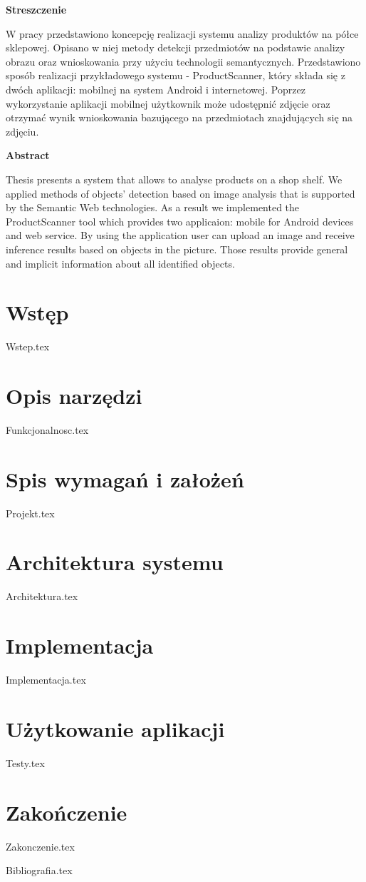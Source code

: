 \documentclass[12pt,a4paper,leqno,oneside,titlepage]{mwrep}
\begin{document}
\thispagestyle{empty}
\newpage

\shipout\null
\begin{center}
{\large\textbf{Streszczenie}}
\end{center}
W pracy przedstawiono koncepcję realizacji systemu analizy produktów na półce sklepowej. Opisano w niej metody detekcji przedmiotów na podstawie analizy obrazu oraz wnioskowania przy użyciu technologii semantycznych. Przedstawiono sposób realizacji przykładowego systemu - ProductScanner, który składa się z dwóch aplikacji: mobilnej na system Android i internetowej. Poprzez wykorzystanie aplikacji mobilnej użytkownik może udostępnić zdjęcie oraz otrzymać wynik wnioskowania bazującego na przedmiotach znajdujących się na zdjęciu.
\newline
\begin{center}
	{\large\textbf{Abstract}}
\end{center}


Thesis  presents a system that allows to analyse products on a shop shelf. We applied methods of objects' detection based on image analysis that is supported by the Semantic Web technologies. As a result we implemented the ProductScanner tool which provides two applicaion: mobile for Android devices and web service. By using the application user can upload an image and receive inference results based on objects in the picture. Those results provide general and implicit information about all identified objects.
\thispagestyle{empty}
\newpage

\shipout\null
\tableofcontents
\thispagestyle{empty}
\newpage
\shipout\null
\chapter{Wstęp}
\setcounter{page}{1}
{Wstep.tex}

\chapter{Opis narzędzi}
{Funkcjonalnosc.tex}

\chapter{Spis wymagań i założeń}
{Projekt.tex}

\chapter{Architektura systemu}
{Architektura.tex}

\chapter{Implementacja}
{Implementacja.tex}

\chapter{Użytkowanie aplikacji}
{Testy.tex}

\chapter{Zakończenie}
{Zakonczenie.tex}

{Bibliografia.tex}
\end{document}
